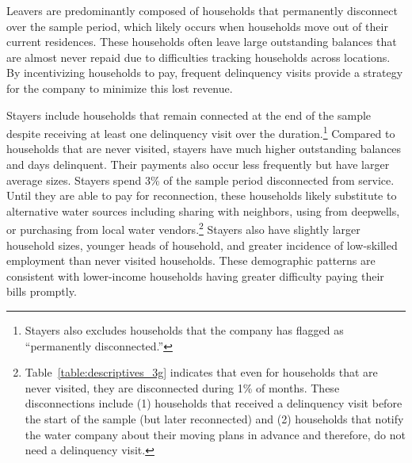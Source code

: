 \documentclass[12pt]{article}
\begin{document}
Leavers are predominantly composed of households that permanently disconnect over the sample period, which likely occurs when households move out of their current residences.  These households often leave large outstanding balances that are almost never repaid due to difficulties tracking households across locations.  By incentivizing households to pay, frequent delinquency visits provide a strategy for the company to minimize this lost revenue.

Stayers include households that remain connected at the end of the sample despite receiving at least one delinquency visit over the duration.\footnote{Stayers also excludes households that the company has flagged as ``permanently disconnected.''}  Compared to households that are never visited, stayers have much higher outstanding balances and days delinquent.  Their payments also occur less frequently but have larger average sizes.  Stayers spend 3\% of the sample period disconnected from service.  Until they are able to pay for reconnection, these households likely substitute to alternative water sources including sharing with neighbors, using from deepwells, or purchasing from local water vendors.\footnote{Table~\ref{table:descriptives_3g} indicates that even for households that are never visited, they are disconnected during 1\% of months.  These disconnections include (1) households that received a delinquency visit before the start of the sample (but later reconnected) and (2) households that notify the water company about their moving plans in advance and therefore, do not need a delinquency visit.}  Stayers also have slightly larger household sizes, younger heads of household, and greater incidence of low-skilled employment than never visited households.  These demographic patterns are consistent with lower-income households having greater difficulty paying their bills promptly.
\end{document}

